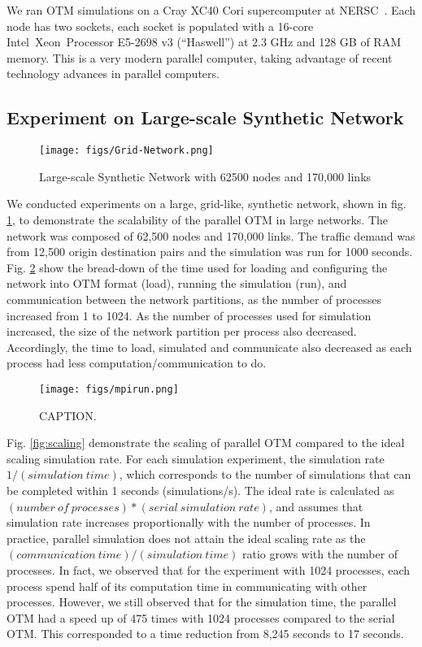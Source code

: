 We ran OTM simulations on a Cray XC40 Cori supercomputer at NERSC~\cite{Cori}. Each node has two sockets, each socket is
populated with a 16-core Intel\textcopyright~Xeon\texttrademark~Processor E5-2698 v3 (``Haswell'') at 2.3 GHz and 128 GB of RAM memory. This is a very modern parallel computer, taking advantage of recent technology advances in parallel computers.

\subsection{Experiment on Large-scale Synthetic Network}
\begin{figure}[h!]
    \centering
    \texttt{[image: figs/Grid-Network.png]}
    \caption{Large-scale Synthetic Network with 62500 nodes and 170,000 links}
    \label{fig:Synthetic_Network}
\end{figure}

We conducted experiments on a large, grid-like, synthetic network, shown in fig. \ref{fig:Synthetic_Network}, to demonstrate the scalability of the parallel OTM in large networks. The network was composed of 62,500 nodes and 170,000 links. The traffic demand was from 12,500 origin destination pairs and the simulation was run for 1000 seconds. Fig. \ref{fig:mpirun} show the bread-down of the time used for loading and configuring the network into OTM format (load), running the simulation (run), and communication between the network partitions, as the number of processes increased from 1 to 1024. As the number of processes used for simulation increased, the size of the network partition per process also decreased. Accordingly, the time to load, simulated and communicate also decreased as each process had less computation/communication to do.

\begin{figure}[h!]
    \centering
    \texttt{[image: figs/mpirun.png]}
    \caption{CAPTION.}
    \label{fig:mpirun}
\end{figure}
Fig. \ref{fig:scaling} demonstrate the scaling of parallel OTM compared to the ideal scaling simulation rate. For each simulation experiment, the simulation rate $1/(simulation \:time)$, which corresponds to the number of simulations that can be completed within 1 seconds (simulations/s). The ideal rate is calculated as $(number\: of\: processes)*(serial\: simulation\: rate)$, and assumes that simulation rate increases proportionally with the number of processes. In practice, parallel simulation does not attain the ideal scaling rate as the $(communication\:time)/(simulation\:time)$ ratio grows with the number of processes. In fact, we observed that for the experiment with 1024 processes, each process spend half of its computation time in communicating with other processes. However, we still observed that for the simulation time, the parallel OTM had a speed up of 475 times with 1024 processes compared to the serial OTM. This corresponded to a time reduction from 8,245 seconds to 17 seconds.

